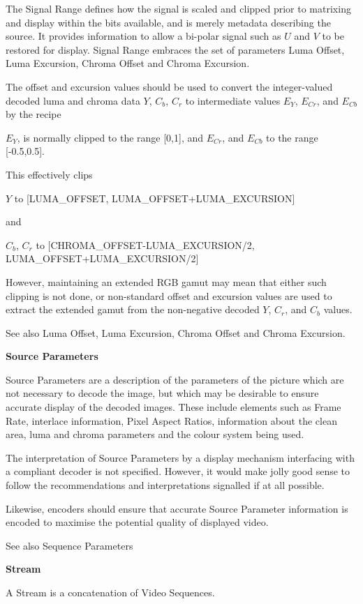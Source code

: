 The Signal Range defines how the signal is scaled and clipped prior to
matrixing and display within the bits available, and is merely metadata
describing the source. It provides information to allow a bi-polar
signal such as $U$ and $V$ to be restored for display. Signal Range
embraces the set of parameters Luma Offset, Luma Excursion, Chroma
Offset and Chroma Excursion.

The offset and excursion values should be used to convert the
integer-valued decoded luma and chroma data $Y$, $C_{b}$, $C_{r}$ to
intermediate values $E_Y$, $E_{Cr}$, and $E_{Cb}$ by the recipe

$E_Y$, is normally clipped to the range [0,1], and $E_{Cr}$, and
$E_{Cb}$ to the range [-0.5,0.5].

This effectively clips

$Y$ to [LUMA\_OFFSET, LUMA\_OFFSET+LUMA\_EXCURSION]

and

$C_{b}$, $C_{r}$ to [CHROMA\_OFFSET-LUMA\_EXCURSION/2,
LUMA\_OFFSET+LUMA\_EXCURSION/2]

However, maintaining an extended RGB gamut may mean that either such
clipping is not done, or non-standard offset and excursion values are
used to extract the extended gamut from the non-negative decoded $Y$,
$C_{r}$, and $C_{b}$ values.

See also Luma Offset, Luma Excursion, Chroma Offset and Chroma Excursion.

\textbf{Source Parameters}

Source Parameters are a description of the parameters of the picture
which are not necessary to decode the image, but which may be desirable
to ensure accurate display of the decoded images. These include elements
such as Frame Rate, interlace information, Pixel Aspect Ratios,
information about the clean area, luma and chroma parameters and the
colour system being used.

The interpretation of Source Parameters by a display mechanism
interfacing with a compliant decoder is not specified. However, it would
make jolly good sense to follow the recommendations and interpretations
signalled if at all possible.

Likewise, encoders should ensure that accurate Source Parameter
information is encoded to maximise the potential quality of displayed
video.

See also Sequence Parameters

\textbf{Stream}

A Stream is a concatenation of Video Sequences.

